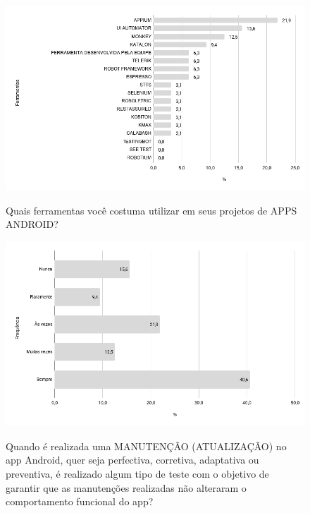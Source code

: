     
        \begin{figure}[!htb]
        \centering
        \includegraphics[width=.80\textwidth]{images/s_ferramentastestes.png}
        \label{figure:s_ferramentastestes}
        \caption{Quais ferramentas você costuma utilizar em seus projetos de APPS ANDROID?}
        \end{figure}
    
    
        \begin{figure}[!htb]
        \centering
        \includegraphics[width=.80\textwidth]{images/s_testemanutencao.png}
        \label{figure:s_testemanutencao}
        \caption{Quando é realizada uma MANUTENÇÃO (ATUALIZAÇÃO) no app Android, quer seja perfectiva, corretiva, adaptativa ou preventiva, é realizado algum tipo de teste com o objetivo de garantir que as manutenções realizadas não alteraram o comportamento funcional do app?}
        \end{figure}   
    
